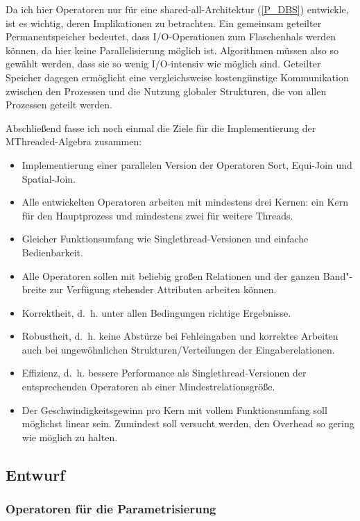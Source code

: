 \documentclass[a4paper,12pt,twoside]{article}
\begin{document}
Da ich hier Operatoren nur für eine shared-all-Architektur (\autoref{P_DBS}) entwickle, ist es wichtig, deren Implikationen zu betrachten. Ein gemeinsam geteilter Permanentspeicher bedeutet, dass I/O-Operationen zum Flaschenhals werden können, da hier keine Parallelisierung möglich ist. Algorithmen müssen also so gewählt werden, dass sie so wenig I/O-intensiv wie möglich sind. Geteilter Speicher dagegen ermöglicht eine vergleichsweise kostengünstige Kommunikation zwischen den Prozessen und die Nutzung globaler Strukturen, die von allen Prozessen geteilt werden.

Abschließend fasse ich noch einmal die Ziele für die Implementierung der MThreaded-Algebra zusammen:

\begin{itemize}
	\item Implementierung einer parallelen Version der Operatoren Sort, Equi-Join und Spatial-Join.
	\item Alle entwickelten Operatoren arbeiten mit mindestens drei Kernen: ein Kern für den Hauptprozess und mindestens zwei für weitere Threads.
	\item Gleicher Funktionsumfang wie Singlethread-Versionen und einfache Bedienbarkeit.
	\item Alle Operatoren sollen mit beliebig großen Relationen und der ganzen Band"-breite zur Verfügung stehender Attributen arbeiten können.  
	\item Korrektheit, d.~h. unter allen Bedingungen richtige Ergebnisse.
	\item Robustheit, d.~h. keine Abstürze bei Fehleingaben und korrektes Arbeiten auch bei ungewöhnlichen Strukturen/Verteilungen der Eingaberelationen.
	\item Effizienz, d.~h. bessere Performance als Singlethread-Versionen der entsprechenden Operatoren ab einer Mindestrelationsgröße.
	\item Der Geschwindigkeitsgewinn pro Kern mit vollem Funktionsumfang soll möglichst linear sein. Zumindest soll versucht werden, den Overhead so gering wie möglich zu halten.
\end{itemize}

\subsection{Entwurf}
\label{Entwicklung} 

\subsubsection{Operatoren für die Parametrisierung}
\end{document}
